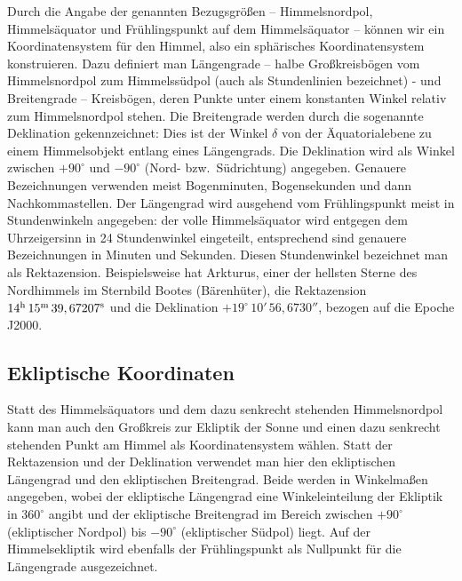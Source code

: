  Durch die Angabe der genannten Bezugsgr\"o\ss en -- Himmelsnordpol, Himmels\"aquator und
 Fr\"uhlingspunkt auf dem Himmels\"aquator -- k\"onnen wir ein Koordinatensystem f\"ur den Himmel, also
 ein sph\"arisches Koordinatensystem konstruieren.
Dazu definiert man L\"angengrade -- halbe Gro\ss kreisb\"ogen vom 
 Himmelsnordpol zum Himmelss\"udpol (auch als Stundenlinien bezeichnet) - 
 und Breitengrade -- Kreisb\"ogen, deren Punkte unter einem konstanten
 Winkel relativ zum Himmelsnordpol stehen. Die Breitengrade werden durch die sogenannte
 Deklination 
 gekennzeichnet: Dies ist der Winkel $\delta$ von der \"Aquatorialebene zu einem Himmelsobjekt
 entlang eines L\"angengrads. Die Deklination wird als Winkel zwischen $+90^\circ$ und $-90^\circ$ 
 (Nord- bzw.\ S\"udrichtung) angegeben. Genauere Bezeichnungen verwenden meist Bogenminuten,
 Bogensekunden und dann Nachkommastellen. Der L\"angengrad wird ausgehend vom Fr\"uhlingspunkt
meist in Stundenwinkeln angegeben: der volle Himmels\"aquator wird entgegen dem Uhrzeigersinn in 
24 Stundenwinkel eingeteilt, entsprechend sind genauere Bezeichnungen in Minuten und Sekunden.
Diesen Stundenwinkel bezeichnet man als Rektazension.
Beispielsweise hat Arkturus, einer der hellsten Sterne des Nordhimmels im Sternbild Bootes (B\"arenh\"uter), 
die Rektazension $14^{\rm h}\,15^{\rm m}\,39,67207^{\rm s}$ und die Deklination $+19^\circ\, 10'\, 56,6730''$,
bezogen auf die Epoche J2000. 

\subsection{Ekliptische Koordinaten}

Statt des Himmels\"aquators und dem dazu senkrecht stehenden Himmelsnordpol kann man 
auch
den Gro\ss kreis zur Ekliptik der Sonne und einen dazu senkrecht stehenden Punkt am Himmel
als Koordinatensystem w\"ahlen. Statt der Rektazension und der Deklination verwendet man hier den
ekliptischen L\"angengrad und den ekliptischen Breitengrad. Beide werden in Winkelma\ss en angegeben,
wobei der ekliptische L\"angengrad eine Winkeleinteilung der Ekliptik in $360^\circ$ angibt und der ekliptische
Breitengrad im Bereich zwischen $+90^\circ$ (ekliptischer Nordpol) bis $-90^\circ$ (ekliptischer S\"udpol) liegt. 
Auf der Himmelsekliptik wird ebenfalls der Fr\"uhlingspunkt als
Nullpunkt f\"ur die L\"angengrade ausgezeichnet. 

